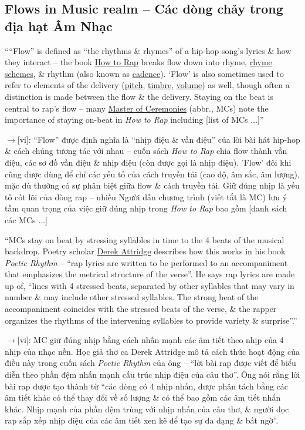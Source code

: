 \documentclass[12pt,oneside]{book}
\begin{document}
\subsection{Flows in Music realm -- Các dòng chảy trong địa hạt Âm Nhạc}
````Flow'' is defined as ``the rhythms \& rhymes'' of a hip-hop song's lyrics \& how they interact -- the book \href{https://en.wikipedia.org/wiki/How_to_Rap}{How to Rap} breaks flow down into rhyme, \href{https://en.wikipedia.org/wiki/Rhyme_scheme}{rhyme schemes}, \& rhythm (also known as \href{https://en.wikipedia.org/wiki/Cadence_(music)}{cadence}). `Flow' is also sometimes used to refer to elements of the delivery (\href{https://en.wikipedia.org/wiki/Pitch_(music)}{pitch}, \href{https://en.wikipedia.org/wiki/Timbre}{timbre}, \href{https://en.wikipedia.org/wiki/Loudness}{volume}) as well, though often a distinction is made between the flow \& the delivery. Staying on the beat is central to rap's flow -- many \href{https://en.wikipedia.org/wiki/Master_of_Ceremonies#Hip_hop}{Master of Ceremonies} (abbr., MCs)  note the importance of staying on-beat in {\it How to Rap} including [list of MCs $\ldots$]''

{\sf[en]$\to$[vi]}: ``Flow'' được định nghĩa là ``nhịp điệu \& vần điệu'' của lời bài hát hip-hop \& cách chúng tương tác với nhau -- cuốn sách {\it How to Rap} chia flow thành vần điệu, các sơ đồ vần điệu \& nhịp điệu (còn được gọi là nhịp điệu). 'Flow' đôi khi cũng được dùng để chỉ các yếu tố của cách truyền tải (cao độ, âm sắc, âm lượng), mặc dù thường có sự phân biệt giữa flow \& cách truyền tải. Giữ đúng nhịp là yếu tố cốt lõi của dòng rap -- nhiều Người dẫn chương trình (viết tắt là MC) lưu ý tầm quan trọng của việc giữ đúng nhịp trong {\it How to Rap} bao gồm [danh sách các MCs $\ldots$]

``MCs stay on beat by stressing syllables in time to the 4 beats of the musical backdrop. Poetry scholar \href{https://en.wikipedia.org/wiki/Derek_Attridge}{\sc Derek Attridge} describes how this works in his book {\it Poetic Rhythm} -- ``rap lyrics are written to be performed to an accompaniment that emphasizes the metrical structure of the verse''. He says rap lyrics are made up of, ``lines with 4 stressed beats, separated by other syllables that may vary in number \& may include other stressed syllables. The strong beat of the accompaniment coincides with the stressed beats of the verse, \& the rapper organizes the rhythms of the intervening syllables to provide variety \& surprise''.''

{\sf[en]$\to$[vi]}: MC giữ đúng nhịp bằng cách nhấn mạnh các âm tiết theo nhịp của 4 nhịp của nhạc nền. Học giả thơ ca {\sc Derek Attridge} mô tả cách thức hoạt động của điều này trong cuốn sách {\it Poetic Rhythm} của ông -- ``lời bài rap được viết để biểu diễn theo phần đệm nhấn mạnh cấu trúc nhịp điệu của câu thơ''. Ông nói rằng lời bài rap được tạo thành từ ``các dòng có 4 nhịp nhấn, được phân tách bằng các âm tiết khác có thể thay đổi về số lượng \& có thể bao gồm các âm tiết nhấn khác. Nhịp mạnh của phần đệm trùng với nhịp nhấn của câu thơ, \& người đọc rap sắp xếp nhịp điệu của các âm tiết xen kẽ để tạo sự đa dạng \& bất ngờ''.
\end{document}
